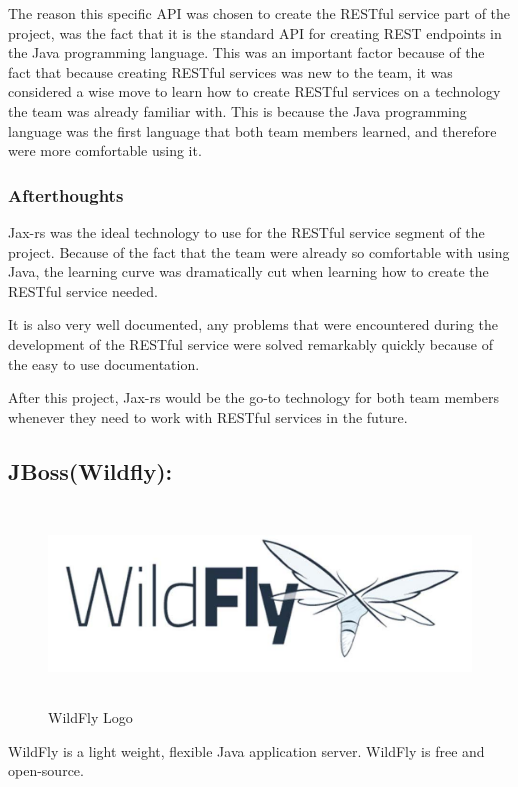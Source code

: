 The reason this specific API was chosen to create the RESTful service part of the project, was the fact that it is the standard API for creating REST endpoints in the Java programming language. This was an important factor because of the fact that because creating RESTful services was new to the team, it was considered a wise move to learn how to create RESTful services on a technology the team was already familiar with. 
This is because the Java programming language was the first language that both team members learned, and therefore were more comfortable using it. 

\subsubsection{Afterthoughts}
Jax-rs was the ideal technology to use for the RESTful service segment of the project. Because of the fact that the team were already so comfortable with using Java, the learning curve was dramatically cut when learning how to create the RESTful service needed. 

It is also very well documented, any problems that were encountered during the development of the RESTful service were solved remarkably quickly because of the easy to use documentation.

\bigskip

After this project, Jax-rs would be the go-to technology for both team members whenever they need to work with RESTful services in the future.

\subsection{JBoss(Wildfly):}
\label{sec:TechnologyReviewWildfly}

\begin{figure}[H]
    \centering
    \includegraphics[width=\textwidth, height=150pt]{img/WildFlyLogo.PNG}
    \caption{WildFly Logo}
    \label{fig:my_label}
\end{figure}
WildFly  is a light weight, flexible Java application server. WildFly is free and open-source.

